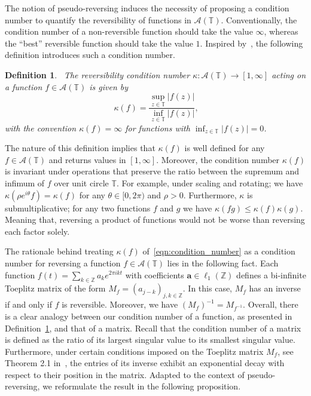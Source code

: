 \documentclass[12pt]{article}
\newtheorem{defin}{Definition}[section]
\begin{document}
The notion of pseudo-reversing induces the necessity of proposing a condition number to quantify the reversibility of functions in $\mathcal{A}(\mathbb{T})$. Conventionally, the condition number of a non-reversible function should take the value $\infty$, whereas the ``best'' reversible function should take the value $1$. Inspired by~\cite{strohmer2002four}, the following definition introduces such a condition number.

\begin{defin}~\label{def:condition_number}
    The reversibility condition number $\kappa \colon \mathcal{A}(\mathbb{T})\rightarrow[1,\infty]$ acting on a function $f\in\mathcal{A}(\mathbb{T})$ is given by
    \begin{equation}~\label{eqn:condition_number}
        \kappa(f)=\frac{\sup_{z\in\mathbb{T}}|f(z)|}{\inf_{z\in\mathbb{T}}|f(z)|},
    \end{equation}
    with the convention $\kappa(f)=\infty$ for functions with $\inf_{z\in\mathbb{T}}|f(z)|=0$.
\end{defin}

The nature of this definition implies that $\kappa(f)$ is well defined for any $f\in\mathcal{A}(\mathbb{T})$ and returns values in $[1,\infty]$. Moreover, the condition number $\kappa(f)$ is invariant under operations that preserve the ratio between the supremum and infimum of $f$ over unit circle $\mathbb{T}$. For example, under scaling and rotating; we have $\kappa(\rho e^{i\theta}f)=\kappa(f)$ for any $\theta\in[0,2\pi)$ and $\rho>0$. Furthermore, $\kappa$ is submultiplicative; for any two functions $f$ and $g$ we have $\kappa(fg)\leq \kappa(f)\kappa(g)$. Meaning that, reversing a product of functions would not be worse than reversing each factor solely.

The rationale behind treating $\kappa(f)$ of~\eqref{eqn:condition_number} as a condition number for reversing a function $f\in\mathcal{A}(\mathbb{T})$ lies in the following fact. Each function $f(t)=\sum_{k\in\mathbb{Z}}a_ke^{2\pi ikt}$ with coefficients $\boldsymbol{a}\in\ell_1(\mathbb{Z})$ defines a bi-infinite Toeplitz matrix of the form $M_{f} = (a_{j-k})_{j,k\in\mathbb{Z}}$. In this case, $M_{f}$ has an inverse if and only if $f$ is
reversible. Moreover, we have $(M_f)^{-1}=M_{f^{-1}}$. Overall, there is a clear analogy between our condition number of a function, as presented in Definition~\ref{def:condition_number}, and that of a matrix. Recall that the condition number of a matrix is defined as the ratio of its largest singular value to its smallest singular value. Furthermore, under certain conditions imposed on the Toeplitz matrix $M_f$, see Theorem 2.1 in~\cite{strohmer2002four}, the entries of its inverse exhibit an exponential decay with respect to their position in the matrix. Adapted to the context of pseudo-reversing, we reformulate the result in the following proposition.
\end{document}
